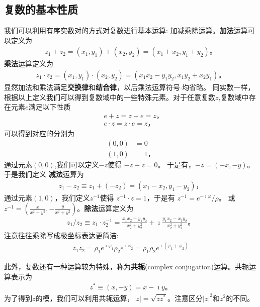 \subsection{复数的基本性质}
我们可以利用有序实数对的方式对复数进行基本运算: 加减乘除运算。{\bf 加法}运算可以定义为
\begin{align}
    z_1 + z_2 = (x_1, y_1) + (x_2, y_2) = (x_1 + x_2, y_1 + y_2) \textrm{。}
\end{align}
{\bf 乘法}运算定义为
\begin{align}
    z_1 \cdot z_2 = (x_1, y_1) \cdot (x_2, y_2) = (x_1 x_2 - y_1 y_2, x_1 y_2 + x_2 y_1) \textrm{。}
\end{align}
显然加法和乘法满足{\bf 交换律}和{\bf 结合律}，以后乘法运算符号$\cdot$均省略。
同实数一样，根据以上定义我们可以得到复数域中的一些特殊元素。对于任意复数$z$,复数域中存在元素$e$满足以下性质
\begin{align}
    & e + z = z + e = z \textrm{，}\\ 
    & e \cdot z = z \cdot e = z \textrm{，} 
\end{align}
可以得到对应的分别为
\begin{align}
    (0, 0) &= 0\\
    (1, 0) &= 1 \textrm{，}
\end{align}
通过元素$(0,0)$,我们可以定义$-z$使得 $-z + z = 0$。 于是有，$- z = (-x, -y)$。于是我们定义
{\bf 减法}运算为 
\begin{align}
    z_1 - z_2 \equiv z_1 + (-z_2) = (x_1 - x_2, y_1 - y_2) \textrm{，}
\end{align}
通过元素$(1,0)$，我们定义$z^{-1}$使得
$z^{-1} \cdot z = 1$，于是有 $z^{-1} =e^{-\imath \varphi}/\rho  $。
或$z^{-1} = (\frac{x}{x^2 + y^2}, -\frac{y}{x^2 + y^2})$。{\bf 除法}运算定义为
\begin{align}
    z_1 / z_2 \equiv z_1 \cdot z_2^{-1} = \frac{x_1 x_2 - y_1 y_2} {x_2^2  +  y_2^2 }  + \imath \frac{y_1 x_2 - x_1 y_2} {x_2^2  +  y_2^2 } \textrm{。} 
\end{align}
注意往往乘除写成极坐标表达更简洁:
\begin{align}
    z_1 z_2 = \rho_1 e^{\imath \varphi_1 } \rho_2 e^{\imath \varphi_2 } = \rho_1 \rho_2 e^{\imath (\varphi_1 + \varphi_2)}
\end{align}

此外，复数还有一种运算较为特殊，称为{\bf 共轭}(complex conjugation)运算。共轭运算表示为
\begin{align}
    z^{*} \equiv (x, -y) = x - \imath y \textrm{。}
\end{align}
为了得到$z$的模，我们可以利用共轭运算，$|z| = \sqrt{zz^{*}}$。注意区分$|z|^2$和$z^2$的不同。

